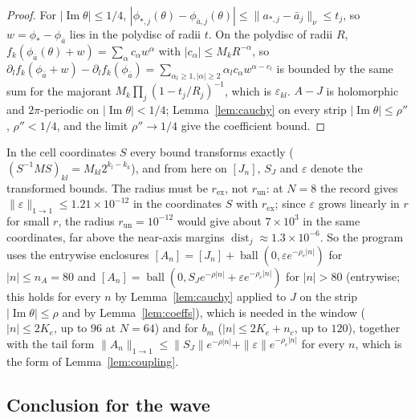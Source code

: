 \documentclass[11pt]{article}
\theoremstyle{definition}
\newcommand{\im}{\operatorname{Im}}
\begin{document}
\begin{proof}
For $|\im\theta| \le 1/4$, $|\phi_{*,j}(\theta) - \phi_{\bar a,j}(\theta)| \le \|a_{*,j} - \bar a_j\|_\nu \le t_j$, so $w = \phi_* - \phi_{\bar a}$ lies in the polydisc of radii $t$. On the polydisc of radii $R$, $f_k(\phi_{\bar a}(\theta) + w) = \sum_\alpha c_\alpha w^\alpha$ with $|c_\alpha| \le M_kR^{-\alpha}$, so $\partial_lf_k(\phi_{\bar a} + w) - \partial_lf_k(\phi_{\bar a}) = \sum_{\alpha_l\ge1,|\alpha|\ge2}\alpha_lc_\alpha w^{\alpha - e_l}$ is bounded by the same sum for the majorant $M_k\prod_j(1 - t_j/R_j)^{-1}$, which is $\varepsilon_{kl}$. $A - J$ is holomorphic and $2\pi$-periodic on $|\im\theta| < 1/4$; Lemma~\ref{lem:cauchy} on every strip $|\im\theta| \le \rho''$, $\rho'' < 1/4$, and the limit $\rho'' \to 1/4$ give the coefficient bound.
\end{proof}

In the cell coordinates $S$ every bound transforms exactly ($(S^{-1}MS)_{kl} = M_{kl}2^{k_l - k_k}$), and from here on $[J_n]$, $S_J$ and $\varepsilon$ denote the transformed bounds. The radius must be $r_{\mathrm{ex}}$, not $r_{\mathrm{un}}$: at $N = 8$ the record gives $\|\varepsilon\|_{1\to1} \le 1.21 \times 10^{-12}$ in the coordinates $S$ with $r_{\mathrm{ex}}$; since $\varepsilon$ grows linearly in $r$ for small $r$, the radius $r_{\mathrm{un}} = 10^{-12}$ would give about $7 \times 10^3$ in the same coordinates, far above the near-axis margins $\operatorname{dist}_j \approx 1.3 \times 10^{-6}$. So the program uses the entrywise enclosures $[A_n] = [J_n] + \operatorname{ball}(0, \varepsilon e^{-\rho_e|n|})$ for $|n| \le n_A = 80$ and $[A_n] = \operatorname{ball}(0, S_Je^{-\rho|n|} + \varepsilon e^{-\rho_e|n|})$ for $|n| > 80$ (entrywise; this holds for every $n$ by Lemma~\ref{lem:cauchy} applied to $J$ on the strip $|\im\theta| \le \rho$ and by Lemma~\ref{lem:coeffs}), which is needed in the window ($|n| \le 2K_e$, up to $96$ at $N = 64$) and for $b_m$ ($|n| \le 2K_e + n_c$, up to $120$), together with the tail form $\|A_n\|_{1\to1} \le \|S_J\|e^{-\rho|n|} + \|\varepsilon\|e^{-\rho_e|n|}$ for every $n$, which is the form of Lemma~\ref{lem:coupling}.

\subsection{Conclusion for the wave}\label{sec:conclusion}
\end{document}

